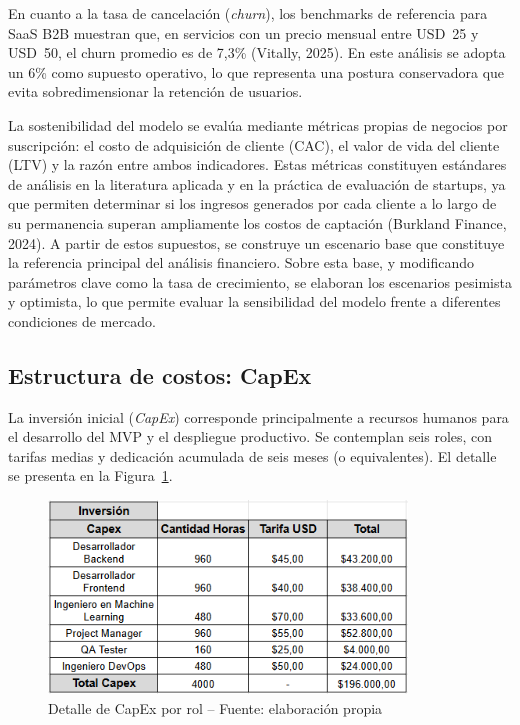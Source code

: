 En cuanto a la tasa de cancelación (\textit{churn}), los benchmarks de referencia para SaaS B2B muestran que, en servicios con un precio mensual entre USD~25 y USD~50, el churn promedio es de 7,3\% (Vitally, 2025). En este análisis se adopta un 6\% como supuesto operativo, lo que representa una postura conservadora que evita sobredimensionar la retención de usuarios.



La sostenibilidad del modelo se evalúa mediante métricas propias de negocios por suscripción: el costo de adquisición de cliente (CAC), el valor de vida del cliente (LTV) y la razón entre ambos indicadores. Estas métricas constituyen estándares de análisis en la literatura aplicada y en la práctica de evaluación de startups, ya que permiten determinar si los ingresos generados por cada cliente a lo largo de su permanencia superan ampliamente los costos de captación (Burkland Finance, 2024). A partir de estos supuestos, se construye un escenario base que constituye la referencia principal del análisis financiero. Sobre esta base, y modificando parámetros clave como la tasa de crecimiento, se elaboran los escenarios pesimista y optimista, lo que permite evaluar la sensibilidad del modelo frente a diferentes condiciones de mercado.



\subsection{Estructura de costos: CapEx}
La inversión inicial (\emph{CapEx}) corresponde principalmente a recursos humanos para el desarrollo del MVP y el despliegue productivo. Se contemplan seis roles, con tarifas medias y dedicación acumulada de seis meses (o equivalentes). El detalle se presenta en la Figura~\ref{fig:capex}.

\begin{figure}[!htbp]
  \centering
  \includegraphics[width=0.85\textwidth]{images/Capex.PNG}
  \caption{Detalle de CapEx por rol -- Fuente: elaboración propia}
  \label{fig:capex}
\end{figure}

